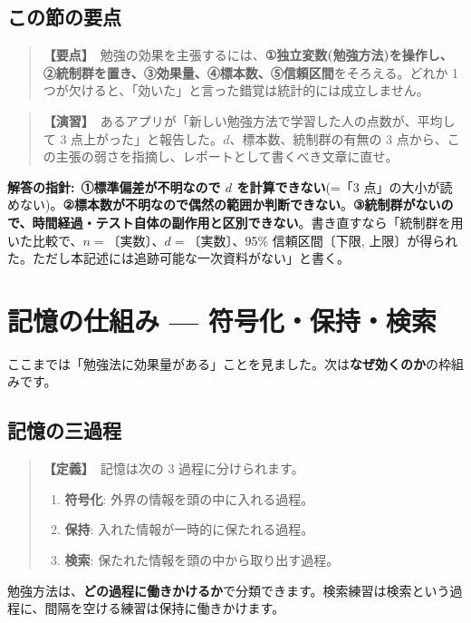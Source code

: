 \documentclass{article}
\begin{document}
\subsection{この節の要点}

\begin{quote}
\textbf{【要点】}\ 勉強の効果を主張するには、\textbf{①独立変数(勉強方法)を操作し、②統制群を置き、③効果量、④標本数、⑤信頼区間}をそろえる。どれか 1 つが欠けると、「効いた」と言った錯覚は統計的には成立しません。
\end{quote}

\begin{quote}
\textbf{【演習】}\ あるアプリが「新しい勉強方法で学習した人の点数が、平均して 3 点上がった」と報告した。\(d\)、標本数、統制群の有無の 3 点から、この主張の弱さを指摘し、レポートとして書くべき文章に直せ。
\end{quote}

\textbf{解答の指針:}\ \textbf{①標準偏差が不明なので \(d\) を計算できない}(=「3 点」の大小が読めない)。\textbf{②標本数が不明なので偶然の範囲か判断できない}。\textbf{③統制群がないので、時間経過・テスト自体の副作用と区別できない}。書き直すなら「統制群を用いた比較で、\(n = \)〔実数〕、\(d = \)〔実数〕、95\% 信頼区間〔下限, 上限〕が得られた。ただし本記述には追跡可能な一次資料がない」と書く。

\section{記憶の仕組み — 符号化・保持・検索}

ここまでは「勉強法に効果量がある」ことを見ました。次は\textbf{なぜ効くのか}の枠組みです。

\subsection{記憶の三過程}

\begin{quote}
\textbf{【定義】}\ 記憶は次の 3 過程に分けられます。
\begin{enumerate}
\item \textbf{符号化}: 外界の情報を頭の中に入れる過程。
\item \textbf{保持}: 入れた情報が一時的に保たれる過程。
\item \textbf{検索}: 保たれた情報を頭の中から取り出す過程。
\end{enumerate}
\end{quote}

勉強方法は、\textbf{どの過程に働きかけるか}で分類できます。検索練習は検索という過程に、間隔を空ける練習は保持に働きかけます。
\end{document}
